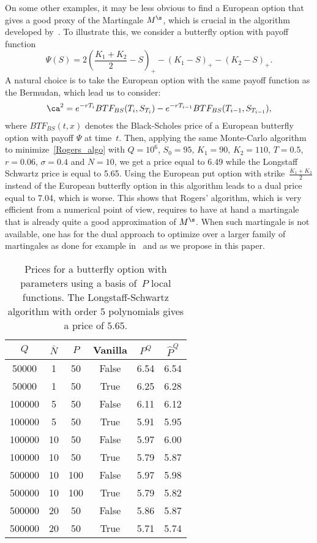 On some other examples, it may be less obvious to find a European option that gives a good proxy of the Martingale $M^\s$, which is crucial in the  algorithm developed by~\cite{rogers-02}. To illustrate this, we consider a butterfly option with payoff function $$\Psi(S)=2\left(\frac{K_1+K_2}2-S\right)_+ - \left(K_1-S\right)_+ - \left(K_2-S\right)_+.$$
A natural choice is to take the European option with the same payoff function as the Bermudan, which lead us to consider:
$$  \ca^2= e^{-r T_i}BTF_{BS}(T_i,S_{T_i}) -e^{-r T_{i-1}}BTF_{BS}(T_{i-1},S_{T_{i-1}}), $$ 
where $BTF_{BS}(t,x)$ denotes the Black-Scholes price of a European butterfly option with payoff $\Psi$ at time~$t$. Then, applying the same Monte-Carlo algorithm to minimize~\eqref{Rogers_algo} with $Q=10^6$, $S_0=95$, $K_1=90$, $K_2=110$, $T=0.5$, $r=0.06$, $\sigma=0.4$ and $N=10$, we get a price equal to 6.49 while the Longstaff Schwartz price is equal to 5.65.  Using the European put option with strike~$\frac{K_1+K_2}2$ instead of the European butterfly option in this algorithm leads to a dual price equal to 7.04, which is worse. This shows that Rogers' algorithm, which is very efficient from a numerical point of view, requires to have at hand a martingale that is already quite a good approximation of $M^\s$. When such martingale is not available, one has for the dual approach to optimize over a larger family of martingales as done for example in~\cite{BH,DFM,Lelong} and as we propose in this paper. 

\begin{table}[htbp!]
  \centering\begin{tabular}{cccccc}
    \hline
    $Q$ & $\bar{N}$ & $P$ & Vanilla\phantom{$\Big|$} & $P^Q$ & $\hat{P}^Q$ \\
    \hline
    50000 & 1 & 50 & False & 6.54 & 6.54 \\
    50000 & 1 & 50 & True & 6.25 & 6.28 \\
    100000 & 5 & 50 & False & 6.11 & 6.12 \\
    100000 & 5 & 50 & True & 5.91 & 5.95 \\
    100000 & 10 & 50 & False & 5.97 & 6.00 \\
    100000 & 10 & 50 & True & 5.79 & 5.87 \\
    500000 & 10 & 100 & False & 5.97 & 5.98 \\
    500000 & 10 & 100 & True & 5.79 & 5.82 \\
    500000 & 20 & 50 & False & 5.86 & 5.87 \\
    500000 & 20 & 50 & True & 5.71 & 5.74 \\
    \hline
    \end{tabular}
    \caption{Prices for a butterfly option with parameters using a basis of~$P$ local functions. The Longstaff-Schwartz algorithm with order $5$ polynomials gives a price of $5.65$. \label{tab:butterfly_loc}}
\end{table}

